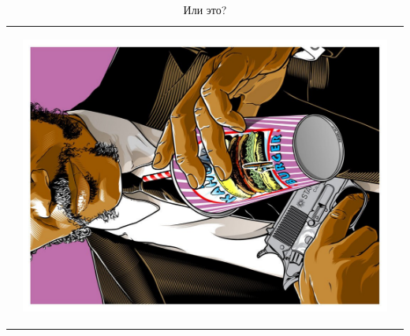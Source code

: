 \documentclass[12pt, a4paper]{article}
\begin{document}
\begin{table}[H]
\begin{center}
\begin{tabular}{ m{5 cm}  m{3.5 cm} m{3.5 cm} }
   &\begin{center}\includegraphics[angle = 270, width= 2.1 cm]{pop1.pdf}  \end{center}  \\

\end{tabular}
\caption*{Или это?}
\end{center}
\end{table}
\end{document}
